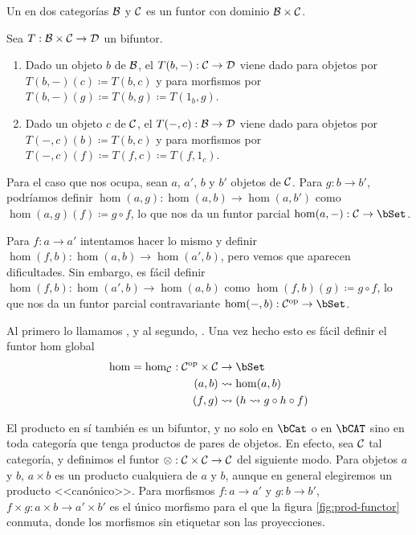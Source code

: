 \begin{definition}
  Un  en dos categorías $\mathcal{B}$ y $\mathcal{C}$ es un funtor con dominio
  $\mathcal{B}\times\mathcal{C}$.
\end{definition}

\begin{definition}
  Sea $T:\mathcal{B}\times\mathcal{C}\to\mathcal{D}$ un bifuntor.
  \begin{enumerate}
  \item Dado un objeto $b$ de $\mathcal{B}$, el  $T(b,-):\mathcal{C}\to\mathcal{D}$
    viene dado para objetos por $T(b,-)(c)\coloneqq T(b,c)$ y para morfismos por
    $T(b,-)(g)\coloneqq T(b,g)\coloneqq T(1_b,g)$.
  \item Dado un objeto $c$ de $\mathcal{C}$, el  $T(-,c):\mathcal{B}\to\mathcal{D}$
    viene dado para objetos por $T(-,c)(b)\coloneqq T(b,c)$ y para morfismos por
    $T(-,c)(f)\coloneqq T(f,c)\coloneqq T(f,1_c)$.
  \end{enumerate}
\end{definition}

Para el caso que nos ocupa, sean $a$, $a'$, $b$ y $b'$ objetos de $\mathcal{C}$. Para
$g:b\to b'$, podríamos definir $\hom(a,g):\hom(a,b)\to\hom(a,b')$ como
$\hom(a,g)(f)\coloneqq g\circ f$, lo que nos da un funtor parcial
$\hom(a,-):\cC\to\bSet$.

Para $f:a\to a'$ intentamos hacer lo mismo y definir
$\hom(f,b):\hom(a,b)\to\hom(a',b)$, pero vemos que aparecen dificultades. Sin
embargo, es fácil definir $\hom(f,b):\hom(a',b)\to\hom(a,b)$ como
$\hom(f,b)(g)\coloneqq g\circ f$, lo que nos da un funtor parcial contravariante
$\hom(-,b):\dual{\cC}\to\bSet$.

Al primero lo llamamos , y al segundo, . Una vez hecho esto es fácil definir el funtor hom global
\[
  \begin{aligned}
    \hom = \hom_{\cC}: \dual{\cC} \times \cC & \to \bSet                          \\
                                      (a, b) & \mapsto \hom(a,b)                  \\
                                      (f, g) & \mapsto (h\mapsto g\circ h\circ f)
  \end{aligned}
\]

El producto en sí también es un bifuntor, y no solo en $\bCat$ o en $\bCAT$ sino
en toda categoría que tenga productos de pares de objetos. En efecto, sea $\mathcal{C}$
tal categoría, y definimos el funtor $\otimes:\mathcal{C}\times\mathcal{C}\to\mathcal{C}$ del siguiente
modo. Para objetos $a$ y $b$, $a\times b$ es un producto cualquiera de $a$ y
$b$, aunque en general elegiremos un producto <<canónico>>. Para morfismos
$f:a\to a'$ y $g:b\to b'$, $f\times g:a\times b\to a'\times b'$ es el único
morfismo para el que la figura \ref{fig:prod-functor} conmuta, donde los
morfismos sin etiquetar son las proyecciones.


